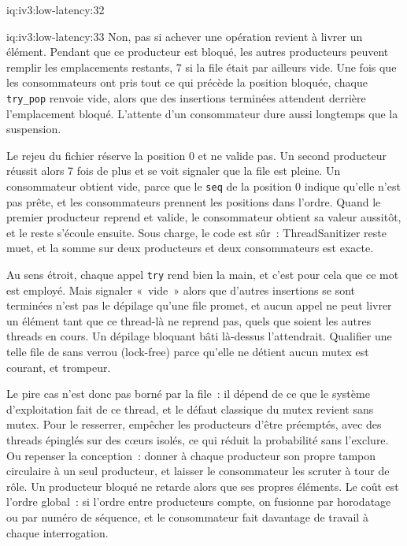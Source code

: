 \begin{solution}{iq:iv3:low-latency:32}
\end{solution}

\begin{solution}{iq:iv3:low-latency:33}
Non, pas si achever une opération revient à livrer un élément. Pendant que ce producteur est bloqué, les autres producteurs peuvent remplir les emplacements restants, 7 si la file était par ailleurs vide. Une fois que les consommateurs ont pris tout ce qui précède la position bloquée, chaque \texttt{try\_pop} renvoie vide, alors que des insertions terminées attendent derrière l'emplacement bloqué. L'attente d'un consommateur dure aussi longtemps que la suspension.

Le rejeu du fichier réserve la position 0 et ne valide pas. Un second producteur réussit alors 7 fois de plus et se voit signaler que la file est pleine. Un consommateur obtient vide, parce que le \texttt{seq} de la position 0 indique qu'elle n'est pas prête, et les consommateurs prennent les positions dans l'ordre. Quand le premier producteur reprend et valide, le consommateur obtient sa valeur aussitôt, et le reste s'écoule ensuite. Sous charge, le code est sûr~: ThreadSanitizer reste muet, et la somme sur deux producteurs et deux consommateurs est exacte.

Au sens étroit, chaque appel \texttt{try} rend bien la main, et c'est pour cela que ce mot est employé. Mais signaler «~vide~» alors que d'autres insertions se sont terminées n'est pas le dépilage qu'une file promet, et aucun appel ne peut livrer un élément tant que ce thread-là ne reprend pas, quels que soient les autres threads en cours. Un dépilage bloquant bâti là-dessus l'attendrait. Qualifier une telle file de sans verrou (lock-free) parce qu'elle ne détient aucun mutex est courant, et trompeur.

Le pire cas n'est donc pas borné par la file~: il dépend de ce que le système d'exploitation fait de ce thread, et le défaut classique du mutex revient sans mutex. Pour le resserrer, empêcher les producteurs d'être préemptés, avec des threads épinglés sur des cœurs isolés, ce qui réduit la probabilité sans l'exclure. Ou repenser la conception~: donner à chaque producteur son propre tampon circulaire à un seul producteur, et laisser le consommateur les scruter à tour de rôle. Un producteur bloqué ne retarde alors que ses propres éléments. Le coût est l'ordre global~: si l'ordre entre producteurs compte, on fusionne par horodatage ou par numéro de séquence, et le consommateur fait davantage de travail à chaque interrogation.

\end{solution}

